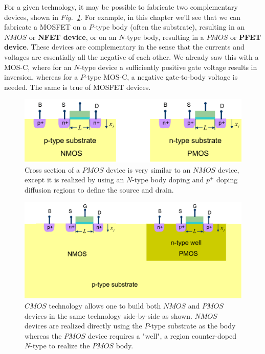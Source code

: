 For a given technology, it may be possible to fabricate two complementary devices, shown in \emph{Fig.~\ref{fig:pmos_xsect}}.  For example, in this chapter we'll see that we can fabricate a MOSFET on a $P$-type body (often the substrate), resulting in an $NMOS$ or \textbf{NFET device}, or on an $N$-type body, resulting in a $PMOS$ or \textbf{PFET device}.  These devices are complementary in the sense that the currents and voltages are essentially all the negative of each other.  We already saw this with a MOS-C, where for an $N$-type device a sufficiently positive gate voltage results in inversion, whereas for a $P$-type MOS-C, a negative gate-to-body voltage is needed. The same is true of MOSFET devices.
\begin{figure}[H]
\centering
\includegraphics[width=\columnwidth]{pmos_xsect}
\caption{Cross section of a $PMOS$ device is very similar to an $NMOS$ device, except it is realized by using an $N$-type body doping and $p^+$ doping diffusion regions to define the source and drain.}
\label{fig:pmos_xsect}
\end{figure}
\newpage
\begin{figure}[t]
\centering
\includegraphics[width=\columnwidth]{cmos_xsect}
\caption{$CMOS$ technology allows one to build both $NMOS$ and $PMOS$ devices in the same technology side-by-side as shown.  $NMOS$ devices are realized directly using the $P$-type substrate as the body whereas the $PMOS$ device requires a "well", a region counter-doped $N$-type to realize the $PMOS$ body.}
\label{fig:cmos_xsect}
\end{figure}
